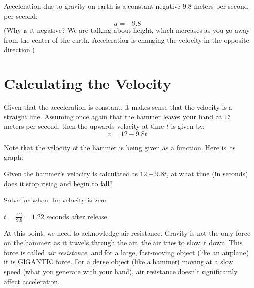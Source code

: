 Acceleration due to gravity on earth is a constant negative 9.8 meters per second per second:
\begin{equation*}
a = -9.8   
\end{equation*}
(Why is it negative? We are talking about height, which increases as
you go away from the center of the earth. Acceleration is changing the
velocity in the opposite direction.)

\section{Calculating the Velocity}

Given that the acceleration is constant, it makes sense that the
velocity is a straight line. Assuming once again that the hammer
leaves your hand at 12 meters per second, then the upwards velocity at
time $t$ is given by:
\begin{equation*}
  v = 12 - 9.8t
\end{equation*}

Note that the velocity of the hammer is being given as a function. Here is its graph:


\begin{Exercise}[title={When is the apex of flight?}, label=vapex]
  Given the hammer's velocity is calculated as $12 - 9.8t$, at what time (in seconds)
  does it stop rising and begin to fall?
\end{Exercise}
\begin{Answer}[ref=vapex]
  Solve for when the velocity is zero.

  $t = \frac{12}{9.8} = 1.22$ seconds after release.
\end{Answer}

At this point, we need to acknowledge air resistance. Gravity
is not the only force on the hammer; as it travels through the air,
the air tries to slow it down. This force is called \emph{air resistance},
and for a large, fast-moving object (like an airplane) it is GIGANTIC force. For a
dense object (like a hammer) moving at a slow speed (what you generate
with your hand), air resistance doesn't significantly affect acceleration.

